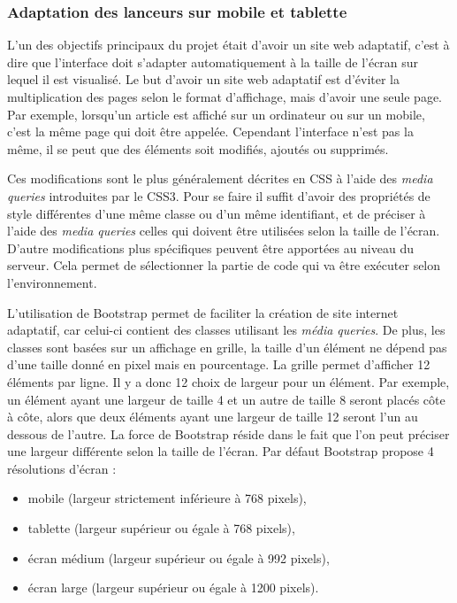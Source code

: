 \documentclass[12pt,a4paper]{article}
\begin{document}
\subsubsection{Adaptation des lanceurs sur mobile et tablette}
L'un des objectifs principaux du projet était d'avoir un site web adaptatif, c'est à dire que l'interface doit s'adapter automatiquement à la taille de l'écran sur lequel il est visualisé. Le but d'avoir un site web adaptatif est d'éviter la multiplication des pages selon le format d'affichage, mais d'avoir une seule page. Par exemple, lorsqu'un article est affiché sur un ordinateur ou sur un mobile, c'est la même page qui doit être appelée. Cependant l'interface n'est pas la même, il se peut que des éléments soit modifiés, ajoutés ou supprimés.\par 
Ces modifications sont le plus généralement décrites en CSS à l'aide des \textit{media queries} introduites par le CSS3. Pour se faire il suffit d'avoir des propriétés de style différentes d'une même classe ou d'un même identifiant, et de préciser à l'aide des \textit{media queries} celles qui doivent être utilisées selon la taille de l'écran. D'autre modifications plus spécifiques peuvent être apportées au niveau du serveur. Cela permet de sélectionner la partie de code qui va être exécuter selon l'environnement.\par
\medskip
L'utilisation de Bootstrap permet de faciliter la création de site internet adaptatif, car celui-ci contient des classes utilisant les \textit{média queries}. De plus, les classes sont basées sur un affichage en grille, la taille d'un élément ne dépend pas d'une taille donné en pixel mais en pourcentage. La grille permet d'afficher 12 éléments par ligne. Il y a donc 12 choix de largeur pour un élément. Par exemple, un élément ayant une largeur de taille 4 et un autre de taille 8 seront placés côte à côte, alors que deux éléments ayant une largeur de taille 12 seront l'un au dessous de l'autre. La force de Bootstrap réside dans le fait que l'on peut préciser une largeur différente selon la taille de l'écran. Par défaut Bootstrap propose 4 résolutions d'écran :
\begin{itemize}
\item mobile (largeur strictement inférieure à 768 pixels),
\item tablette (largeur supérieur ou égale à 768 pixels),
\item écran médium (largeur supérieur ou égale à 992 pixels),
\item écran large (largeur supérieur ou égale à 1200 pixels).
\end{itemize}
\end{document}
